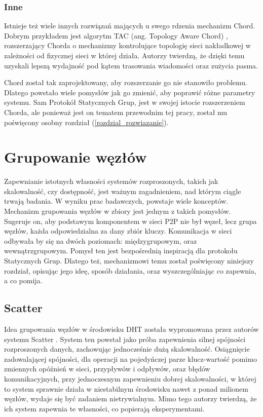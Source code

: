 \documentclass[12pt, twoside, openany]{report}
\begin{document}
\subsection{Inne}

Istnieje też wiele innych rozwiązań mających u swego rdzenia mechanizm Chord. Dobrym przykładem jest algorytm TAC (ang. Topology Aware Chord) \cite{bib:tac}, rozszerzający Chorda o mechanizmy kontrolujące topologię sieci nakładkowej w zależności od fizycznej sieci w której działa. Autorzy twierdzą, że dzięki temu uzyskali lepszą wydajność pod kątem trasowania wiadomości oraz zużycia pasma.

Chord został tak zaprojektowany, aby rozszerzanie go nie stanowiło problemu. Dlatego powstało wiele pomysłów jak go zmienić, aby poprawić różne parametry systemu. Sam Protokół Statycznych Grup, jest w swojej istocie rozszerzeniem Chorda, ale ponieważ jest on tematem przewodnim tej pracy, został mu poświęcony osobny rozdział (\ref{rozdzial_rozwiazanie}).


\chapter{Grupowanie węzłów}
\label{rozdzial_grupowanie}

Zapewnianie istotnych własności systemów rozproszonych, takich jak skalowalność, czy dostępność, jest ważnym zagadnieniem, nad którym ciągle trwają badania. W wyniku prac badawczych, powstaje wiele konceptów. Mechanizm grupowania węzłów w zbiory jest jednym z takich pomysłów. Sugeruje on, aby podstawym komponentem w sieci P2P nie był węzeł, lecz grupa węzłów, każda odpowiedzialna za dany zbiór kluczy. Komunikacja w sieci odbywała by się na dwóch poziomach: międzygrupowym, oraz wewnątrzgrupowym. Pomysł ten jest bezpośrednią inspiracją dla protokołu Statycznych Grup. Dlatego też, mechanizmowi temu został poświęcony niniejszy rozdział, opisując jego ideę, sposób działania, oraz wyszczególniając co zapewnia, a co pomija.

\section{Scatter}

Idea grupowania węzłów w środowisku DHT została wypromowana przez autorów systemu Scatter \cite{bib:scatter}. System ten powstał jako próba zapewnienia silnej spójności rozproszonych danych, 
zachowując jednocześnie dużą skalowalność. Osiągnięcie zadowalającej spójności, dla operacji na pojedyńczej parze klucz-wartość pomimo zmiennych opóźnień w sieci, przypływów i odpływów, oraz błędów komunikacyjnych, przy jednoczesnym zapewnieniu dobrej skalowalności, w której to system sprawnie działa w niestabilnym środowisku nawet z ponad milionem węzłów, wydaje się być zadaniem nietrywialnym. Mimo tego autorzy twierdzą, że ich system zapewnia te własności, co popierają eksperymentami.
\end{document}
